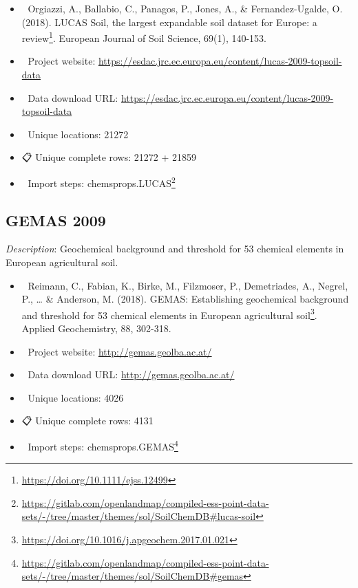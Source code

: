 \documentclass[
  graybox,natbib,nospthms]{svmono}
\providecommand{\tightlist}{%
  \setlength{\itemsep}{0pt}\setlength{\parskip}{0pt}}
\providecommand{\tightlist}{\setlength{\itemsep}{0pt}\setlength{\parskip}{0pt}}
\renewcommand{\href}[2]{#2 (\url{#1})}
\renewcommand{\href}[2]{#2\footnote{\url{#1}}}
\begin{document}
\begin{itemize}
\tightlist
\item
  📕 Orgiazzi, A., Ballabio, C., Panagos, P., Jones, A., \& Fernandez-Ugalde, O. (2018). \href{https://doi.org/10.1111/ejss.12499}{LUCAS Soil, the largest expandable soil dataset for Europe: a review}. European Journal of Soil Science, 69(1), 140-153.\\
\item
  🔗 Project website: \url{https://esdac.jrc.ec.europa.eu/content/lucas-2009-topsoil-data}\\
\item
  📂 Data download URL: \url{https://esdac.jrc.ec.europa.eu/content/lucas-2009-topsoil-data}\\
\item
  📍 Unique locations: 21272\\
\item
  📋 Unique complete rows: 21272 + 21859\\
\item
  📝 Import steps: \href{https://gitlab.com/openlandmap/compiled-ess-point-data-sets/-/tree/master/themes/sol/SoilChemDB\#lucas-soil}{chemsprops.LUCAS}
\end{itemize}

\hypertarget{gemas-2009}{%
\subsection{GEMAS 2009}\label{gemas-2009}}

\emph{Description}: Geochemical background and threshold for 53 chemical elements in
European agricultural soil.

\begin{itemize}
\tightlist
\item
  📕 Reimann, C., Fabian, K., Birke, M., Filzmoser, P., Demetriades, A., Negrel, P., \ldots{} \& Anderson, M. (2018). \href{https://doi.org/10.1016/j.apgeochem.2017.01.021}{GEMAS: Establishing geochemical background and threshold for 53 chemical elements in European agricultural soil}. Applied Geochemistry, 88, 302-318.\\
\item
  🔗 Project website: \url{http://gemas.geolba.ac.at/}\\
\item
  📂 Data download URL: \url{http://gemas.geolba.ac.at/}\\
\item
  📍 Unique locations: 4026\\
\item
  📋 Unique complete rows: 4131\\
\item
  📝 Import steps: \href{https://gitlab.com/openlandmap/compiled-ess-point-data-sets/-/tree/master/themes/sol/SoilChemDB\#gemas}{chemsprops.GEMAS}
\end{itemize}
\end{document}
